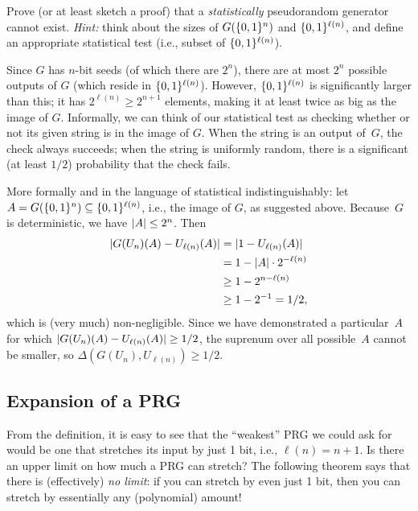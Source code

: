 \documentclass[11pt]{article}
\begin{document}
\begin{question}
  Prove (or at least sketch a proof) that a \emph{statistically}
  pseudorandom generator cannot exist. \emph{Hint:} think about the
  sizes of $G(\{0,1\}^n)$ and $\{0,1\}^{\ell(n)}$, and define an appropriate
  statistical test (i.e., subset of $\{0,1\}^{\ell(n)}$).
\end{question}

\begin{answer}
  Since $G$ has $n$-bit seeds (of which there are $2^n$), there are at
  most $2^n$ possible outputs of $G$ (which reside in
  $\{0,1\}^{\ell(n)}$). However, $\{0,1\}^{\ell(n)}$ is significantly larger
  than this; it has $2^{\ell(n)} \geq 2^{n+1}$ elements, making it at
  least twice as big as the image of \(G\). Informally, we can think
  of our statistical test as checking whether or not its given string
  is in the image of $G$. When the string is an output of~$G$, the
  check always succeeds; when the string is uniformly random, there is
  a significant (at least $1/2$) probability that the check fails.

  More formally and in the language of statistical indistinguishably:
  let $A = G(\{0,1\}^n) \subseteq \{0,1\}^{\ell(n)}$, i.e., the image of
  $G$, as suggested above. Because~$G$ is deterministic, we have
  $\lvert A\rvert \leq 2^{n}$. Then
  \[
    \begin{aligned}
      \lvert G(U_n)(A) - U_{\ell(n)}(A)\rvert
      &= \lvert1 - U_{\ell(n)}(A)\rvert \\
      &= 1 - \lvert A\rvert \cdot 2^{-\ell(n)}  \\
      &\geq 1 - 2^{n-\ell(n)} \\
      &\geq 1 - 2^{-1} = 1/2,
    \end{aligned}
  \]
  which is (very much) non-negligible. Since we have demonstrated a
  particular~$A$ for which
  $\lvert G(U_n)(A) - U_{\ell(n)}(A)\rvert \geq 1/2$, the suprenum over all
  possible~$A$ cannot be smaller, so
  $\Delta(G(U_n), U_{\ell(n)}) \geq 1/2$.
\end{answer}

\subsection{Expansion of a PRG}
\label{sec:properties}

From the definition, it is easy to see that the ``weakest'' PRG we
could ask for would be one that stretches its input by just 1 bit,
i.e., $\ell(n) = n+1$.  Is there an upper limit on how much a PRG can
stretch?  The following theorem says that there is (effectively)
\emph{no limit}: if you can stretch by even just 1 bit, then you can
stretch by essentially any (polynomial) amount!
\end{document}
